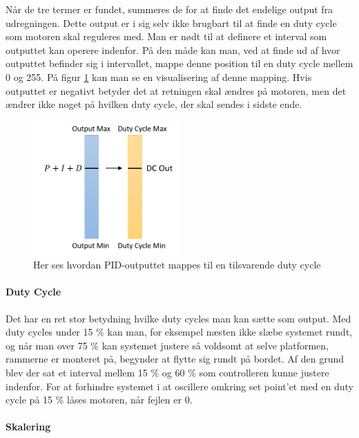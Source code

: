 Når de tre termer er fundet, summeres de for at finde det endelige output fra udregningen. Dette output er i sig selv ikke brugbart til at finde en duty cycle som motoren skal reguleres med. Man er nødt til at definere et interval som outputtet kan operere indenfor. På den måde kan man, ved at finde ud af hvor outputtet befinder sig i intervallet, mappe denne position til en duty cycle mellem 0 og 255. På figur \ref{fig:Mapping} kan man se en visualisering af denne mapping. Hvis outputtet er negativt betyder det at retningen skal ændres på motoren, men det ændrer ikke noget på hvilken duty cycle, der skal sendes i sidste ende.\\

\begin{figure}
	\begin{center}
		\includegraphics[width=0.5\textwidth]{Billeder/Mapping.png}
	\end{center}		
	\caption{Her ses hvordan PID-outputtet mappes til en tilsvarende duty cycle}
	\label{fig:Mapping}	
\end{figure}

\paragraph{Duty Cycle}

Det har en ret stor betydning hvilke duty cycles man kan sætte som output. Med duty cycles under 15 $\%$ kan man, for eksempel næsten ikke slæbe systemet rundt, og når man over 75 $\%$ kan systemet justere så voldsomt at selve platformen, rammerne er monteret på, begynder at flytte sig rundt på bordet. Af den grund blev der sat et interval mellem 15 $\%$ og 60 $\%$ som controlleren kunne justere indenfor. For at forhindre systemet i at oscillere omkring set point'et med en duty cycle på 15 $\%$ låses motoren, når fejlen er 0.

\paragraph{Skalering}

